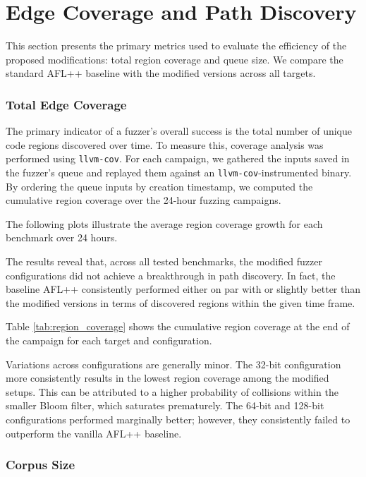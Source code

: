 \section{Edge Coverage and Path Discovery}

This section presents the primary metrics used to evaluate the efficiency of the proposed modifications: total region coverage and queue size. We compare the standard AFL++ baseline with the modified versions across all targets.

\subsubsection{Total Edge Coverage}

The primary indicator of a fuzzer's overall success is the total number of unique code regions discovered over time. To measure this, coverage analysis was performed using \texttt{llvm-cov}. For each campaign, we gathered the inputs saved in the fuzzer's queue and replayed them against an \texttt{llvm-cov}-instrumented binary. By ordering the queue inputs by creation timestamp, we computed the cumulative region coverage over the 24-hour fuzzing campaigns.

The following plots illustrate the average region coverage growth for each benchmark over 24 hours.



\newpage

The results reveal that, across all tested benchmarks, the modified fuzzer configurations did not achieve a breakthrough in path discovery. In fact, the baseline AFL++ consistently performed either on par with or slightly better than the modified versions in terms of discovered regions within the given time frame.

Table \ref{tab:region_coverage} shows the cumulative region coverage at the end of the campaign for each target and configuration.



Variations across configurations are generally minor. The 32-bit configuration more consistently results in the lowest region coverage among the modified setups. This can be attributed to a higher probability of collisions within the smaller Bloom filter, which saturates prematurely. The 64-bit and 128-bit configurations performed marginally better; however, they consistently failed to outperform the vanilla AFL++ baseline.

\subsubsection{Corpus Size}

